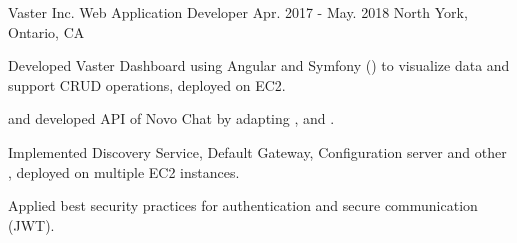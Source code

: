 \begin{cventries}
  \cventry
    {Vaster Inc.} %
    {Web Application Developer} %
    {Apr. 2017 - May. 2018} %
    {North York, Ontario, CA} %
    {
      \begin{cvitems} %
        \item {Developed Vaster Dashboard using Angular and Symfony () to visualize data and support CRUD operations, deployed on  EC2.}
        \item { and developed  API of Novo Chat by adapting ,  and .}
          \begin{cvsubitems}
            \item {Implemented Discovery Service, Default Gateway, Configuration server and other , deployed on multiple  EC2 instances.}
          \end{cvsubitems}
        \item {Applied best security practices for authentication and  secure communication (JWT).}
      \end{cvitems}
    }

\end{cventries}

